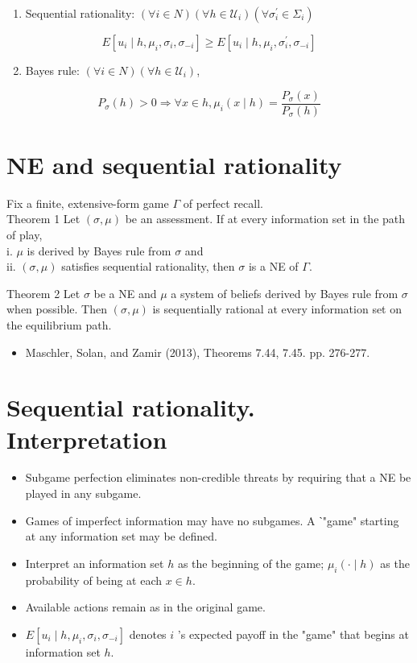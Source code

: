 \documentclass[10pt]{article}
\begin{document}
\begin{enumerate}
  \item Sequential rationality: $(\forall i \in N)\left(\forall h \in \mathcal{U}_{i}\right)\left(\forall \sigma_{i}^{\prime} \in \Sigma_{i}\right)$
\end{enumerate}

$$
E\left[u_{i} \mid h, \mu_{i}, \sigma_{i}, \sigma_{-i}\right] \geq E\left[u_{i} \mid h, \mu_{i}, \sigma_{i}^{\prime}, \sigma_{-i}\right]
$$

\begin{enumerate}
  \setcounter{enumi}{1}
  \item Bayes rule: $(\forall i \in N)\left(\forall h \in \mathcal{U}_{i}\right)$,
\end{enumerate}

$$
P_{\sigma}(h)>0 \Longrightarrow \forall x \in h, \mu_{i}(x \mid h)=\frac{P_{\sigma}(x)}{P_{\sigma}(h)}
$$

\section*{NE and sequential rationality}
Fix a finite, extensive-form game $\Gamma$ of perfect recall.\\
Theorem 1 Let $(\sigma, \mu)$ be an assessment. If at every information set in the path of play,\\
i. $\mu$ is derived by Bayes rule from $\sigma$ and\\
ii. $(\sigma, \mu)$ satisfies sequential rationality, then $\sigma$ is a NE of $\Gamma$.

Theorem 2 Let $\sigma$ be a NE and $\mu$ a system of beliefs derived by Bayes rule from $\sigma$ when possible. Then $(\sigma, \mu)$ is sequentially rational at every information set on the equilibrium path.

\begin{itemize}
  \item Maschler, Solan, and Zamir (2013), Theorems 7.44, 7.45. pp. 276-277.
\end{itemize}

\section*{Sequential rationality. Interpretation}
\begin{itemize}
  \item Subgame perfection eliminates non-credible threats by requiring that a NE be played in any subgame.
  \item Games of imperfect information may have no subgames. A ˋ"game" starting at any information set may be defined.
  \item Interpret an information set $h$ as the beginning of the game; $\mu_{i}(\cdot \mid h)$ as the probability of being at each $x \in h$.
  \item Available actions remain as in the original game.
  \item $E\left[u_{i} \mid h, \mu_{i}, \sigma_{i}, \sigma_{-i}\right]$ denotes $i$ 's expected payoff in the "game" that begins at information set $h$.
\end{itemize}
\end{document}
